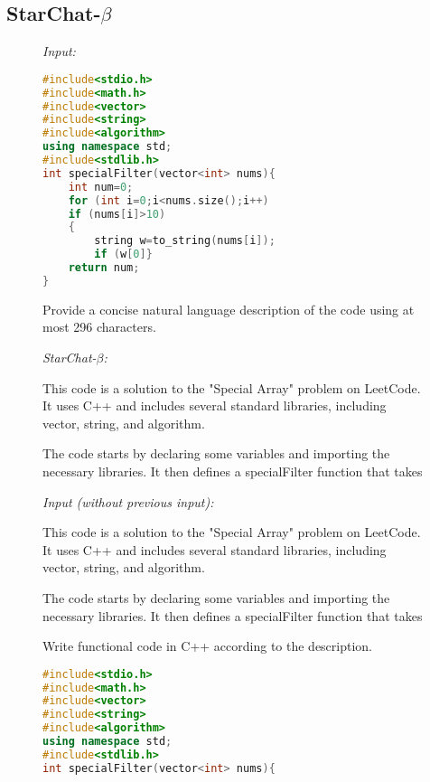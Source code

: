\subsection{StarChat-\texorpdfstring{$\beta$}{beta}}
\label{sec:examplesstarchatbeta}

\begin{figure}[htbp]
\hrulefill

\emph{Input:}

\hrulefill

\begin{lstlisting}[language=C++,breaklines=true,basicstyle=\ttfamily\scriptsize]
#include<stdio.h>
#include<math.h>
#include<vector>
#include<string>
#include<algorithm>
using namespace std;
#include<stdlib.h>
int specialFilter(vector<int> nums){
    int num=0;
    for (int i=0;i<nums.size();i++)
    if (nums[i]>10)
    {
        string w=to_string(nums[i]);
        if (w[0]}
    return num;
}
\end{lstlisting}

Provide a concise natural language description of the code using at most 296 characters.

\hrulefill

\emph{StarChat-$\beta$:}

\hrulefill

This code is a solution to the "Special Array" problem on LeetCode. It uses C++ and includes several standard libraries, including vector, string, and algorithm.

The code starts by declaring some variables and importing the necessary libraries. It then defines a specialFilter function that takes


\hrulefill

\emph{Input (without previous input):}

\hrulefill

This code is a solution to the "Special Array" problem on LeetCode. It uses C++ and includes several standard libraries, including vector, string, and algorithm.

The code starts by declaring some variables and importing the necessary libraries. It then defines a specialFilter function that takes

Write functional code in C++ according to the description.
\begin{lstlisting}[language=C++,breaklines=true,basicstyle=\ttfamily\scriptsize]
#include<stdio.h>
#include<math.h>
#include<vector>
#include<string>
#include<algorithm>
using namespace std;
#include<stdlib.h>
int specialFilter(vector<int> nums){
\end{lstlisting}


\end{figure}
